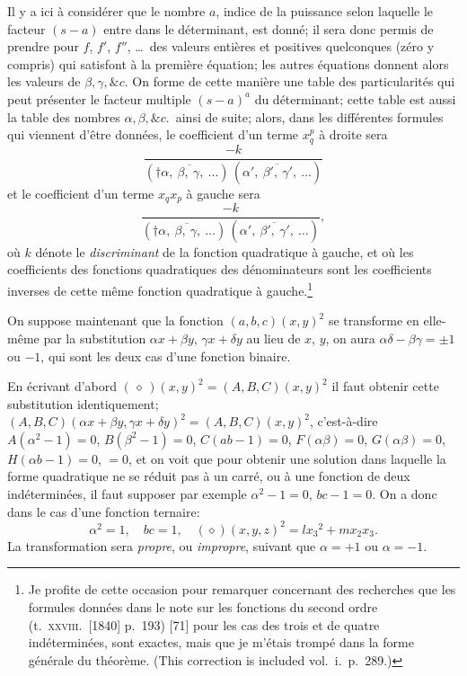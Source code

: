 \documentclass[11pt,a4paper]{article}
\begin{document}
Il y a ici \`a consid\'erer que le nombre $a$, indice de la puissance selon laquelle le facteur $(s - a)$ entre dans le d\'eterminant, est donn\'e; il sera donc permis de prendre pour $f$, $f'$, $f''$, \ldots\ des valeurs enti\`eres et positives quelconques (z\'ero y compris) qui satisfont \`a la premi\`ere \'equation; les autres \'equations donnent alors les valeurs de $\beta, \gamma, \&c.$ On forme de cette mani\`ere une table des particularit\'es qui peut pr\'esenter le facteur multiple $(s - a)^a$ du d\'eterminant; cette table est aussi la table des nombres $\alpha, \beta, \&c.$\ ainsi de suite; alors, dans les diff\'erentes formules qui viennent d'\^etre donn\'ees, le coefficient d'un terme $x_q^p$ \`a droite sera
\[
\frac{-k}{(\dagger\overline{\alpha,\ \beta,\ \gamma,\ \ldots})\,(\overline{\alpha',\ \beta',\ \gamma',\ \ldots})}
\]
et le coefficient d'un terme $x_q x_p$ \`a gauche sera
\[
\frac{-k}{(\dagger\overline{\alpha,\ \beta,\ \gamma,\ \ldots})\,(\overline{\alpha',\ \beta',\ \gamma',\ \ldots})},
\]
o\`u $k$ d\'enote le \textit{discriminant} de la fonction quadratique \`a gauche, et o\`u les coefficients des fonctions quadratiques des d\'enominateurs sont les coefficients inverses de cette m\^eme fonction quadratique \`a gauche.\footnote{Je profite de cette occasion pour remarquer concernant des recherches que les formules donn\'ees dans le note sur les fonctions du second ordre (t.\ \textsc{xxviii}.\ [1840] p.\ 193) [71] pour les cas des trois et de quatre ind\'etermin\'ees, sont exactes, mais que je m'\'etais tromp\'e dans la forme g\'en\'erale du th\'eor\`eme. (This correction is included vol.\ i.\ p.\ 289.)}

\medskip

\noindent On suppose maintenant que la fonction $(a, b, c)(x, y)^2$ se transforme en elle-m\^eme par la substitution $\alpha x + \beta y$, $\gamma x + \delta y$ au lieu de $x$, $y$, on aura $\alpha\delta - \beta\gamma = \pm 1$ ou $-1$, qui sont les deux cas d'une fonction binaire.

\medskip

En \'ecrivant d'abord $(\,\diamond\,)(x, y)^2 = (A, B, C)(x, y)^2$ il faut obtenir cette substitution identiquement; $(A, B, C)(\alpha x + \beta y, \gamma x + \delta y)^2 = (A, B, C)(x, y)^2$, c'est-\`a-dire $A(\alpha^2 - 1) = 0$, $B(\beta^2 - 1) = 0$, $C(a b - 1) = 0$, $F(\alpha\beta) = 0$, $G(\alpha\beta) = 0$, $H(\alpha b - 1) = 0$, $=0$, et on voit que pour obtenir une solution dans laquelle la forme quadratique ne se r\'eduit pas \`a un carr\'e, ou \`a une fonction de deux ind\'etermin\'ees, il faut supposer par exemple $\alpha^2 - 1 = 0$, $bc - 1 = 0$. On a donc dans le cas d'une fonction ternaire:
\[
\alpha^2 = 1,\quad bc = 1,\quad (\diamond)(x, y, z)^2 = lx_3{}^2 + m x_2 x_3.
\]
La transformation sera \textit{propre}, ou \textit{impropre}, suivant que $\alpha = +1$ ou $\alpha = -1$.
\end{document}
